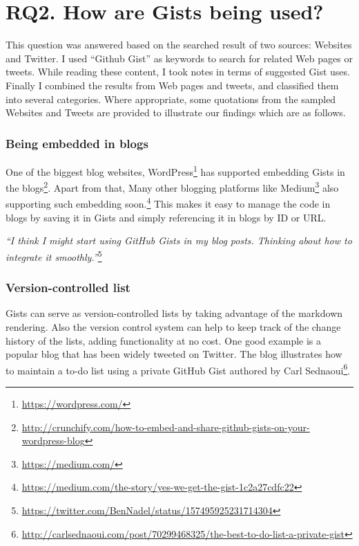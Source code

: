 \section{RQ2. How are Gists being used?}

This question was answered based on the searched result of two sources: Websites and Twitter. I used ``Github Gist'' as keywords to search for related Web pages or tweets. While reading these content, I took notes in terms of suggested Gist uses. Finally I combined the results from Web pages and tweets, and classified them into several categories. Where appropriate, some quotations from the sampled Websites and Tweets are provided to illustrate our findings which are as follows. 

\subsubsection{Being embedded in blogs}

One of the biggest blog websites, WordPress\footnote{\url{https://wordpress.com/}} has supported embedding Gists in the blogs\footnote{\url{http://crunchify.com/how-to-embed-and-share-github-gists-on-your-wordpress-blog}}. Apart from that, Many other blogging platforms like Medium\footnote{\url{https://medium.com/}} also supporting such embedding soon.\footnote{\url{https://medium.com/the-story/yes-we-get-the-gist-1c2a27cdfc22}} This makes it easy to manage the code in blogs by saving it in Gists and simply referencing it in blogs by ID or URL.

\textsl{``I think I might start using GitHub Gists in my blog posts. Thinking about how to integrate it smoothly.''}\footnote{\url{https://twitter.com/BenNadel/status/157495925231714304}}

\subsubsection{Version-controlled list}

Gists can serve as version-controlled lists by taking advantage of the markdown rendering. Also the version control system can help to keep track of the change history of the lists, adding functionality at no cost. One good example is a popular blog that has been widely tweeted on Twitter. The blog illustrates how to maintain a to-do list using a private GitHub Gist authored by Carl Sednaoui\footnote{\url{http://carlsednaoui.com/post/70299468325/the-best-to-do-list-a-private-gist}}.

